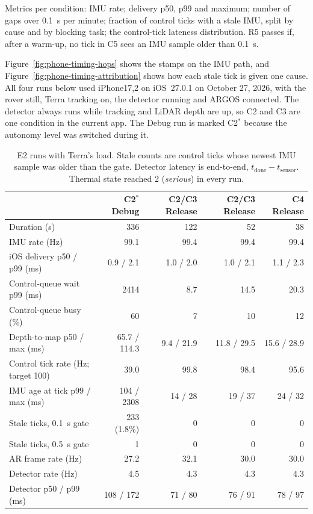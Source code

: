 Metrics per condition: IMU rate; delivery p50, p99 and maximum; number of gaps over 0.1~s per minute; fraction of control ticks with a stale IMU, split by cause and by blocking task; the control-tick lateness distribution.
R5 passes if, after a warm-up, no tick in C5 sees an IMU sample older than 0.1~s.



Figure~\ref{fig:phone-timing-hops} shows the stamps on the IMU path, and Figure~\ref{fig:phone-timing-attribution} shows how each stale tick is given one cause.
All four runs below used iPhone17,2 on iOS~27.0.1 on October 27, 2026, with the rover still, Terra tracking on, the detector running and ARGOS connected.
The detector always runs while tracking and LiDAR depth are up, so C2 and C3 are one condition in the current app.
The Debug run is marked C2$^{*}$ because the autonomy level was switched during it.

\begin{table}[ht]
\centering
\caption{E2 runs with Terra's load. Stale counts are control ticks whose newest IMU sample was older than the gate. Detector latency is end-to-end, $t_{\text{done}} - t_{\text{sensor}}$. Thermal state reached 2 (\emph{serious}) in every run.}
\label{tab:phone-release}
\small
\begin{tabular}{@{}l r r r r@{}}
\toprule
 & C2$^{*}$ Debug & C2/C3 Release & C2/C3 Release & C4 Release \\
\midrule
Duration (s) & 336 & 122 & 52 & 38 \\
IMU rate (Hz) & 99.1 & 99.4 & 99.4 & 99.4 \\
iOS delivery p50 / p99 (ms) & 0.9 / 2.1 & 1.0 / 2.0 & 1.0 / 2.1 & 1.1 / 2.3 \\
Control-queue wait p99 (ms) & 2414 & 8.7 & 14.5 & 20.3 \\
Control-queue busy (\%) & 60 & 7 & 10 & 12 \\
Depth-to-map p50 / max (ms) & 65.7 / 114.3 & 9.4 / 21.9 & 11.8 / 29.5 & 15.6 / 28.9 \\
Control tick rate (Hz; target 100) & 39.0 & 99.8 & 98.4 & 95.6 \\
IMU age at tick p99 / max (ms) & 104 / 2308 & 14 / 28 & 19 / 37 & 24 / 32 \\
Stale ticks, 0.1~s gate & 233 (1.8\%) & 0 & 0 & 0 \\
Stale ticks, 0.5~s gate & 1 & 0 & 0 & 0 \\
AR frame rate (Hz) & 27.2 & 32.1 & 30.0 & 30.0 \\
Detector rate (Hz) & 4.5 & 4.3 & 4.3 & 4.3 \\
Detector p50 / p99 (ms) & 108 / 172 & 71 / 80 & 76 / 91 & 78 / 97 \\
\bottomrule
\end{tabular}
\end{table}

